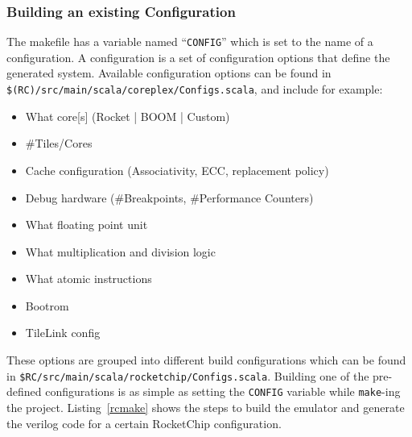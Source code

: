 \documentclass[journal,a4paper]{IEEEtran}
\begin{document}
\subsubsection{Building an existing Configuration}
The makefile has a variable named ``\texttt{CONFIG}'' which is set to the name of a configuration.
A configuration is a set of configuration options that define the generated system.
Available configuration options can be found in \texttt{\$(RC)/src/main/scala/coreplex/Configs.scala}, and include for example:

\begin{itemize}
	\item What core[s] (Rocket | BOOM | Custom)
	\item \#Tiles/Cores
	\item Cache configuration (Associativity, ECC, replacement policy)
	\item Debug hardware (\#Breakpoints, \#Performance Counters)
	\item What floating point unit
	\item What multiplication and division logic
	\item What atomic instructions
	\item Bootrom
	\item TileLink config
\end{itemize}
These options are grouped into different build configurations which can be found in \texttt{\$RC/src/main/scala/rocketchip/Configs.scala}.
Building one of the pre-defined configurations is as simple as setting the \texttt{CONFIG} variable while \texttt{make}-ing the project.
Listing~\ref{rcmake} shows the steps to build the emulator and generate the verilog code for a certain RocketChip configuration.
\end{document}
